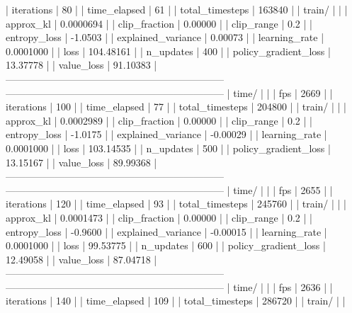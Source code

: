 |    iterations           |           80 |
|    time_elapsed         |           61 |
|    total_timesteps      |       163840 |
| train/                  |              |
|    approx_kl            |    0.0000694 |
|    clip_fraction        |      0.00000 |
|    clip_range           |          0.2 |
|    entropy_loss         |      -1.0503 |
|    explained_variance   |      0.00073 |
|    learning_rate        |    0.0001000 |
|    loss                 |    104.48161 |
|    n_updates            |          400 |
|    policy_gradient_loss |     13.37778 |
|    value_loss           |     91.10383 |
------------------------------------------------------------------
------------------------------------------------------------------
| time/                   |              |
|    fps                  |         2669 |
|    iterations           |          100 |
|    time_elapsed         |           77 |
|    total_timesteps      |       204800 |
| train/                  |              |
|    approx_kl            |    0.0002989 |
|    clip_fraction        |      0.00000 |
|    clip_range           |          0.2 |
|    entropy_loss         |      -1.0175 |
|    explained_variance   |     -0.00029 |
|    learning_rate        |    0.0001000 |
|    loss                 |    103.14535 |
|    n_updates            |          500 |
|    policy_gradient_loss |     13.15167 |
|    value_loss           |     89.99368 |
------------------------------------------------------------------
------------------------------------------------------------------
| time/                   |              |
|    fps                  |         2655 |
|    iterations           |          120 |
|    time_elapsed         |           93 |
|    total_timesteps      |       245760 |
| train/                  |              |
|    approx_kl            |    0.0001473 |
|    clip_fraction        |      0.00000 |
|    clip_range           |          0.2 |
|    entropy_loss         |      -0.9600 |
|    explained_variance   |     -0.00015 |
|    learning_rate        |    0.0001000 |
|    loss                 |     99.53775 |
|    n_updates            |          600 |
|    policy_gradient_loss |     12.49058 |
|    value_loss           |     87.04718 |
------------------------------------------------------------------
------------------------------------------------------------------
| time/                   |              |
|    fps                  |         2636 |
|    iterations           |          140 |
|    time_elapsed         |          109 |
|    total_timesteps      |       286720 |
| train/                  |              |
